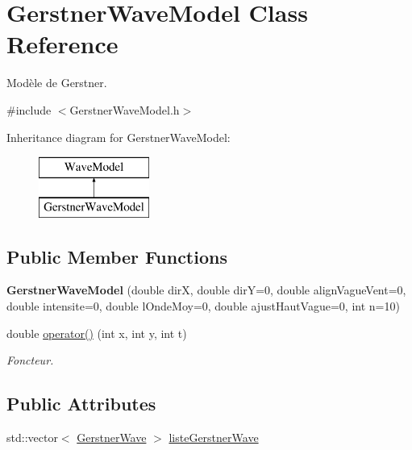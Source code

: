 \hypertarget{class_gerstner_wave_model}{}\section{Gerstner\+Wave\+Model Class Reference}
\label{class_gerstner_wave_model}


Modèle de Gerstner.  




{\ttfamily \#include $<$Gerstner\+Wave\+Model.\+h$>$}

Inheritance diagram for Gerstner\+Wave\+Model\+:\begin{figure}[H]
\begin{center}
\leavevmode
\includegraphics[height=2.000000cm]{class_gerstner_wave_model}
\end{center}
\end{figure}
\subsection*{Public Member Functions}
\begin{DoxyCompactItemize}
\item 
\hypertarget{class_gerstner_wave_model_a4720c379eb0456649f8e4f0112baeee0}{}\label{class_gerstner_wave_model_a4720c379eb0456649f8e4f0112baeee0} 
{\bfseries Gerstner\+Wave\+Model} (double dirX, double dirY=0, double align\+Vague\+Vent=0, double intensite=0, double l\+Onde\+Moy=0, double ajust\+Haut\+Vague=0, int n=10)
\item 
double \hyperlink{class_gerstner_wave_model_af7df138d591a6fb8e8cbda16e26336ab}{operator()} (int x, int y, int t)
\begin{DoxyCompactList}\small\item\em Foncteur. \end{DoxyCompactList}\end{DoxyCompactItemize}
\subsection*{Public Attributes}
\begin{DoxyCompactItemize}
\item 
std\+::vector$<$ \hyperlink{class_gerstner_wave}{Gerstner\+Wave} $>$ \hyperlink{class_gerstner_wave_model_a25b41754840bd8f3aa2691a388ce42c5}{liste\+Gerstner\+Wave}
\end{DoxyCompactItemize}


